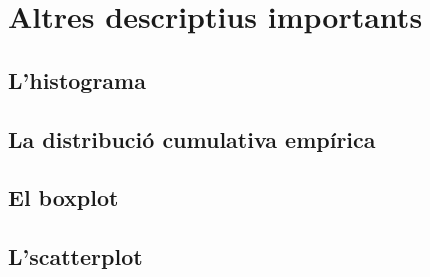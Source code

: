 \documentclass[letterpaper,10pt,english]{sphinxmanual}
\begin{document}
\begin{sphinxVerbatim}[commandchars=\\\{\}]
  
  
   
  
    \PYG{n}{[i}\PYG{n}{]}  
  
    
        
 
\end{sphinxVerbatim}


\section{Altres descriptius importants}
\label{\detokenize{0_Intro/0_2_Intro_stats:altres-descriptius-importants}}

\subsection{L’histograma}
\label{\detokenize{0_Intro/0_2_Intro_stats:l-histograma}}

\subsection{La distribució cumulativa empírica}
\label{\detokenize{0_Intro/0_2_Intro_stats:la-distribucio-cumulativa-empirica}}

\subsection{El boxplot}
\label{\detokenize{0_Intro/0_2_Intro_stats:el-boxplot}}

\subsection{L’scatterplot}
\label{\detokenize{0_Intro/0_2_Intro_stats:l-scatterplot}}
\end{document}
